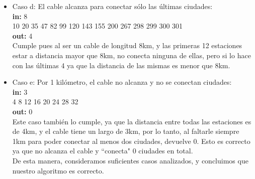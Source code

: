 \begin{itemize}
\item Caso d: El cable alcanza para conectar sólo las últimas ciudades:\\
\textbf{in:}
8\\
10 20 35 47 82 99 120 143 155 200 267 298 299 300 301\\
\textbf{out:}
4\\

Cumple pues al ser un cable de longitud 8km, y las primeras 12 estaciones estar a distancia mayor que 8km, no conecta ninguna de ellas, pero si lo hace con las últimas 4 ya que la distancia de las mismas es menor que 8km. \\

\item Caso e: Por 1 kilómetro, el cable no alcanza y no se conectan ciudades:\\
\textbf{in:}
3\\
4 8 12 16 20 24 28 32 \\
\textbf{out:}
0\\

Este caso también lo cumple, ya que la distancia entre todas las estaciones es de 4km, y el cable tiene un largo de 3km, por lo tanto, al faltarle siempre 1km para poder conectar al menos dos ciudades, devuelve 0. Esto es correcto ya que no alcanza el cable y ``conecta" 0 ciudades en total. \\

De esta manera, consideramos suficientes casos analizados, y concluimos que nuestro algoritmo es correcto.

\end{itemize}


